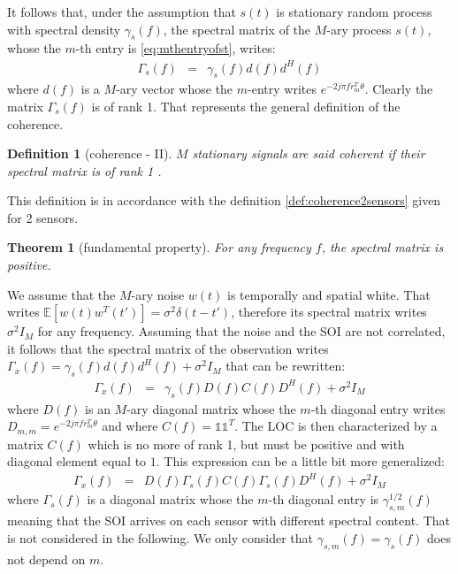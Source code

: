 \documentclass[a4paper, 12pt]{report}
\newcommand{\esp}[1]{\mathds{E}\left[ #1 \right]}
\newtheorem{theorem}{Theorem}
\newtheorem{definition}{Definition}
\begin{document}
It follows  that, under the assumption  that $s(t)$ is stationary random process with spectral density $\gamma_{s}(f)$, the spectral matrix of the $M$-ary process $s(t)$, whose the $m$-th entry is \eqref{eq:mthentryofst}, writes:
\begin{eqnarray*}
\Gamma_{s}(f)&=&\gamma_{s}(f)d(f)d^{H}(f)
\end{eqnarray*}
where $d(f)$ is a $M$-ary vector whose the $m$-entry writes $e^{-2j\pi fr_{m}^{T}\theta}$. Clearly the matrix $\Gamma_{s}(f)$ is of rank 1.  That represents the general definition of the coherence. 
\begin{definition}[coherence - II]
\label{def:coherenceMsensors}
$M$ stationary signals are said coherent if their spectral matrix is of rank 1 . 
\end{definition}

This definition is in accordance with the definition \ref{def:coherence2sensors} given for 2 sensors. 

\begin{theorem}[fundamental property]
For any frequency $f$, the spectral matrix is positive.
\end{theorem}


We assume that the $M$-ary noise $w(t)$ is temporally and spatial white. That writes $\esp{w(t)w^{T}(t')}=\sigma^{2}\delta(t-t')$, therefore its spectral matrix writes $\sigma^{2}I_M$ for any frequency. Assuming that the noise and the SOI are not correlated, it follows that the spectral matrix of the observation writes $\Gamma_{x}(f)= \gamma_{s}(f)d(f)d^{H}(f) + \sigma^{2}I_M$ that can be rewritten:
\begin{eqnarray}
\label{eq:generaldensitymatrixwithLOC}
 \Gamma_{x}(f)&=& \gamma_{s}(f)D(f)C(f)D^{H}(f) + \sigma^{2}I_M
\end{eqnarray}
where $D(f)$ is an $M$-ary diagonal matrix whose the $m$-th diagonal entry writes $D_{m,m}=e^{-2j\pi f r_{m}^{T}\theta }$ and where $C(f)=\mathds{1}\mathds{1}^{T}$. The LOC is then characterized by a matrix $C(f)$ which is no more of rank 1,  but must be positive and with diagonal element equal to $1$. This expression can be a little bit more generalized:
\begin{eqnarray*}
 \Gamma_{x}(f)&=&D(f)\Gamma_{s}(f)C(f)\Gamma_{s}(f)D^{H}(f)+ \sigma^{2}I_M
\end{eqnarray*}
where $\Gamma_{s}(f)$ is a diagonal matrix whose the $m$-th diagonal entry is $\gamma_{s,m}^{1/2}(f)$ meaning that the SOI arrives on each sensor with different spectral content. That is not considered in the following. We only consider that $\gamma_{s,m}(f)=\gamma_{s}(f)$ does not depend on $m$.
\end{document}
